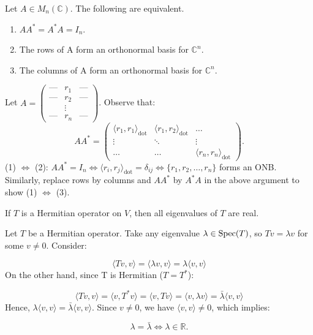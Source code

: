\begin{theorem}
Let $A\in M_{n}(\mathbb{C})$. The following are equivalent.
\begin{enumerate}
    \item $AA^{*}=A^{*}A=I_{n}.$
    \item The rows of A form an orthonormal basis for $\mathbb{C}^{n}$.
    \item The columns of A form an orthonormal basis for $\mathbb{C}^{n}$.
\end{enumerate}
\end{theorem}

\begin{pfbox}
Let $A = \begin{pmatrix} \text{---} & r_1 & \text{---} \\ \text{---} & r_2 & \text{---} \\ & \vdots & \\ \text{---} & r_n & \text{---} \end{pmatrix}$.
Observe that:
\[
AA^{*} = \begin{pmatrix} \langle r_1, r_1 \rangle_{\text{dot}} & \langle r_1, r_2 \rangle_{\text{dot}} & \dots \\ \vdots & \ddots & \vdots \\ \dots & \dots & \langle r_n, r_n \rangle_{\text{dot}} \end{pmatrix}.
\]
(1) $\Leftrightarrow$ (2): $AA^{*}=I_{n} \Leftrightarrow \langle r_i, r_j \rangle_{\text{dot}} = \delta_{ij} \Leftrightarrow \{r_1, r_2, \dots, r_n\}$ forms an ONB.
Similarly, replace rows by columns and $AA^*$ by $A^*A$ in the above argument to show (1) $\Leftrightarrow$ (3).
\end{pfbox}

\begin{theorem}
If $T$ is a Hermitian operator on $V$, then all eigenvalues of $T$ are real.
\end{theorem}

\begin{pfbox}
Let $T$ be a Hermitian operator. Take any eigenvalue $\lambda \in \operatorname{Spec}(T)$, so $Tv = \lambda v$ for some $v \neq 0$.
Consider:

\[
\langle Tv, v \rangle = \langle \lambda v, v \rangle = \lambda \langle v, v \rangle
\]
On the other hand, since T is Hermitian ($T = T^*$):

\[
\langle Tv, v \rangle = \langle v, T^*v \rangle = \langle v, Tv \rangle = \langle v, \lambda v \rangle = \bar{\lambda} \langle v, v \rangle
\]
Hence, $\lambda \langle v, v \rangle = \bar{\lambda} \langle v, v \rangle$. Since $v \neq 0$, we have $\langle v, v \rangle \neq 0$, which implies:

\[
\lambda = \bar{\lambda} \Leftrightarrow \lambda \in \mathbb{R}.
\]
\end{pfbox}

